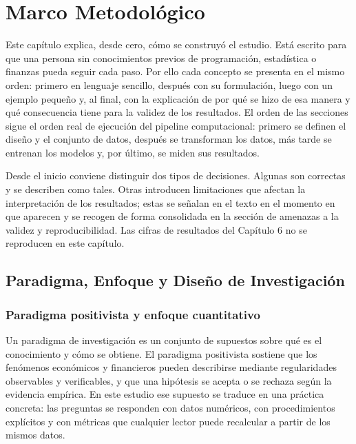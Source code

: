 \chapter{Marco Metodológico}

Este capítulo explica, desde cero, cómo se construyó el estudio. Está escrito para que una persona sin conocimientos previos de programación, estadística o finanzas pueda seguir cada paso. Por ello cada concepto se presenta en el mismo orden: primero en lenguaje sencillo, después con su formulación, luego con un ejemplo pequeño y, al final, con la explicación de por qué se hizo de esa manera y qué consecuencia tiene para la validez de los resultados. El orden de las secciones sigue el orden real de ejecución del pipeline computacional: primero se definen el diseño y el conjunto de datos, después se transforman los datos, más tarde se entrenan los modelos y, por último, se miden sus resultados.

Desde el inicio conviene distinguir dos tipos de decisiones. Algunas son correctas y se describen como tales. Otras introducen limitaciones que afectan la interpretación de los resultados; estas se señalan en el texto en el momento en que aparecen y se recogen de forma consolidada en la sección de amenazas a la validez y reproducibilidad. Las cifras de resultados del Capítulo 6 no se reproducen en este capítulo.

\section{Paradigma, Enfoque y Diseño de Investigación}

\subsection{Paradigma positivista y enfoque cuantitativo}
Un paradigma de investigación es un conjunto de supuestos sobre qué es el conocimiento y cómo se obtiene. El paradigma positivista sostiene que los fenómenos económicos y financieros pueden describirse mediante regularidades observables y verificables, y que una hipótesis se acepta o se rechaza según la evidencia empírica. En este estudio ese supuesto se traduce en una práctica concreta: las preguntas se responden con datos numéricos, con procedimientos explícitos y con métricas que cualquier lector puede recalcular a partir de los mismos datos.


